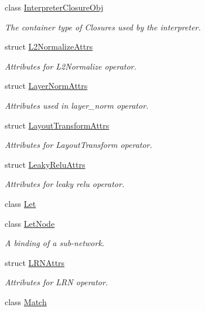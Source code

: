 \begin{DoxyCompactItemize}
\item 
class \hyperlink{classtvm_1_1relay_1_1InterpreterClosureObj}{Interpreter\+Closure\+Obj}
\begin{DoxyCompactList}\small\item\em The container type of Closures used by the interpreter. \end{DoxyCompactList}\item 
struct \hyperlink{structtvm_1_1relay_1_1L2NormalizeAttrs}{L2\+Normalize\+Attrs}
\begin{DoxyCompactList}\small\item\em Attributes for L2\+Normalize operator. \end{DoxyCompactList}\item 
struct \hyperlink{structtvm_1_1relay_1_1LayerNormAttrs}{Layer\+Norm\+Attrs}
\begin{DoxyCompactList}\small\item\em Attributes used in layer\+\_\+norm operator. \end{DoxyCompactList}\item 
struct \hyperlink{structtvm_1_1relay_1_1LayoutTransformAttrs}{Layout\+Transform\+Attrs}
\begin{DoxyCompactList}\small\item\em Attributes for Layout\+Transform operator. \end{DoxyCompactList}\item 
struct \hyperlink{structtvm_1_1relay_1_1LeakyReluAttrs}{Leaky\+Relu\+Attrs}
\begin{DoxyCompactList}\small\item\em Attributes for leaky relu operator. \end{DoxyCompactList}\item 
class \hyperlink{classtvm_1_1relay_1_1Let}{Let}
\item 
class \hyperlink{classtvm_1_1relay_1_1LetNode}{Let\+Node}
\begin{DoxyCompactList}\small\item\em A binding of a sub-\/network. \end{DoxyCompactList}\item 
struct \hyperlink{structtvm_1_1relay_1_1LRNAttrs}{L\+R\+N\+Attrs}
\begin{DoxyCompactList}\small\item\em Attributes for L\+RN operator. \end{DoxyCompactList}\item 
class \hyperlink{classtvm_1_1relay_1_1Match}{Match}
\item 

\end{DoxyCompactItemize}
